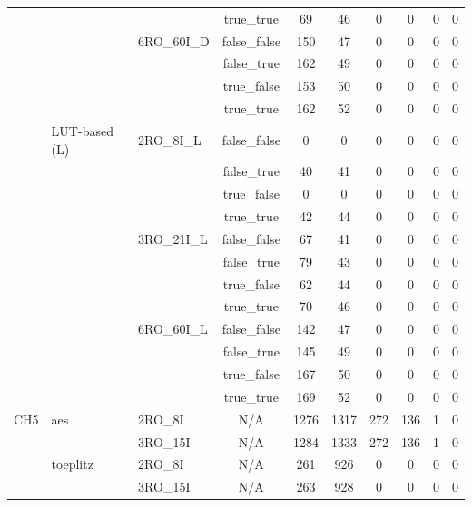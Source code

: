 \documentclass{article}
\begin{document}
\begin{longtable}{lllccccccc}
 &  &  & true\_true & 69 & 46 & 0 & 0 & 0 & 0 \\
 &  & 6RO\_60I\_D & false\_false & 150 & 47 & 0 & 0 & 0 & 0 \\
 &  &  & false\_true & 162 & 49 & 0 & 0 & 0 & 0 \\
 &  &  & true\_false & 153 & 50 & 0 & 0 & 0 & 0 \\
 &  &  & true\_true & 162 & 52 & 0 & 0 & 0 & 0 \\
 & LUT-based (L) & 2RO\_8I\_L & false\_false & 0 & 0 & 0 & 0 & 0 & 0 \\
 &  &  & false\_true & 40 & 41 & 0 & 0 & 0 & 0 \\
 &  &  & true\_false & 0 & 0 & 0 & 0 & 0 & 0 \\
 &  &  & true\_true & 42 & 44 & 0 & 0 & 0 & 0 \\
 &  & 3RO\_21I\_L & false\_false & 67 & 41 & 0 & 0 & 0 & 0 \\
 &  &  & false\_true & 79 & 43 & 0 & 0 & 0 & 0 \\
 &  &  & true\_false & 62 & 44 & 0 & 0 & 0 & 0 \\
 &  &  & true\_true & 70 & 46 & 0 & 0 & 0 & 0 \\
 &  & 6RO\_60I\_L & false\_false & 142 & 47 & 0 & 0 & 0 & 0 \\
 &  &  & false\_true & 145 & 49 & 0 & 0 & 0 & 0 \\
 &  &  & true\_false & 167 & 50 & 0 & 0 & 0 & 0 \\
 &  &  & true\_true & 169 & 52 & 0 & 0 & 0 & 0 \\
CH5 & aes & 2RO\_8I & N/A & 1276 & 1317 & 272 & 136 & 1 & 0 \\
 &  & 3RO\_15I & N/A & 1284 & 1333 & 272 & 136 & 1 & 0 \\
 & toeplitz & 2RO\_8I & N/A & 261 & 926 & 0 & 0 & 0 & 0 \\
 &  & 3RO\_15I & N/A & 263 & 928 & 0 & 0 & 0 & 0 \\
\end{longtable}
\end{document}
